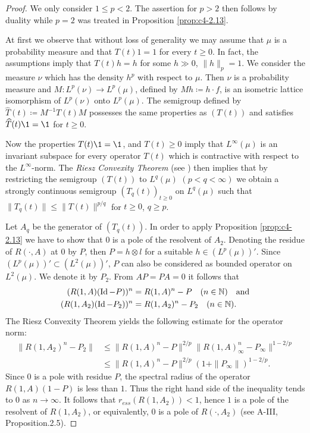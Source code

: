 \begin{proof}
We only consider $1 \leq p < 2$.
The assertion for $p > 2$ then follows by duality while $p = 2$ was treated in Proposition \ref{prop:c4-2.13}.

At first we observe that without loss of generality we may assume that $\mu$ is a probability measure and that $T(t)1 = 1$ for every $t \geq 0$.
In fact, the assumptions imply that $T(t)h = h$ for some $h \gg 0$, $\|h\|_{p} = 1$.
We consider the measure $\nu$ which has the density $h^{p}$ with respect to $\mu$.
Then $\nu$ is a probability measure and 
$M \colon L^{p}(\nu) \to L^{p}(\mu)$, defined by $Mh \coloneqq h\cdot f$, is an isometric lattice isomorphism of $L^{p}(\nu)$ onto $L^{p}(\mu)$.
The semigroup defined by $\widehat{T}(t) \coloneqq M^{-1}T(t)M$ possesses the same properties as $(T(t))$ and satisfies $\widehat{T}(t)\1 = \1$ for $t \geq 0$.

Now the properties $T(t)\1 = \1$, and $T(t) \geq 0$ imply that $L^{\infty}(\mu)$ is an invariant subspace for every operator $T(t)$ which is contractive with respect to the $L^{\infty}$-norm.
The \emph{Riesz Convexity Theorem} (see \citet[VI.10.11]{dunfordschwartz:1958}) then implies that by restricting the semigroup $(T(t))$ to $L^{q}(\mu)$ $(p < q < \infty)$ we obtain a strongly continuous semigroup $(T_{q}(t))_{t \geq 0}$ on $L^{q}(\mu)$ such that $\|T_{q}(t)\| \leq \|T(t)\|^{p/q}$ for $t \geq 0$, $q \geq p$.

Let $A_{q}$ be the generator of $(T_{q}(t))$.
In order to apply Proposition \ref{prop:c4-2.13} we have to show that $0$ is a pole of the resolvent of $A_{2}$.
Denoting the residue of $R(\cdot,A)$ at $0$ by $P$, then $P = h \otimes l$ for a suitable $h \in (L^{p}(\mu))'$.
Since $(L^{p}(\mu))' \subset (L^{2}(\mu))'$, $P$ can also be considered as bounded operator on $L^{2}(\mu)$.
We denote it by $P_{2}$.
From $AP = PA = 0$ it follows that
\begin{align*}
(R(1,A)(\operatorname{Id}-P))^{n} &= R(1,A)^{n} - P \quad (n \in \mathbb{N}) \quad \text{and} \\
(R(1,A_{2})(\operatorname{Id}-P_{2}))^{n} &= R(1,A_{2})^{n} - P_{2} \quad (n \in \mathbb{N}).
\end{align*}
The Riesz Convexity Theorem yields the following estimate for the operator norm:
\begin{align*}
\|R(1,A_{2})^{n} - P_{2}\| &\leq \|R(1,A)^{n} - P\|^{2/p}\|R(1,A)_{\infty}^{n} - P_{\infty}\|^{1-2/p} \\
&\leq \|R(1,A)^{n} - P\|^{2/p}(1 + \|P_{\infty}\|)^{1-2/p}.
\end{align*}
Since $0$ is a pole with residue $P$, the spectral radius of the operator $R(1,A)(1-P)$ is less than $1$.
Thus the right hand side of the inequality tends to $0$ as $n \to \infty$.
It follows that $r_{ess}(R(1,A_{2})) < 1$, hence $1$ is a pole of the resolvent of $R(1,A_{2})$, or equivalently, $0$ is a pole of $R(\cdot,A_{2})$ (see A-III, Proposition.2.5).


\end{proof}
